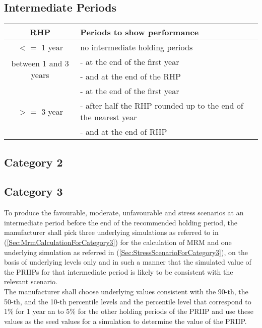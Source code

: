 \subsection{Intermediate Periods}
\begin{center}
	\begin{tabular}{| c | p{10cm} |}
		\hline
		\textbf{RHP} & \textbf{Periods to show performance}\\
		\hline
		$<=$ 1 year & no intermediate holding periods\\
		\hline
		\multirow{2}{*}{between 1 and 3 years} & - at the end of the first year\\
		& - and at the end of the RHP\\
		\hline
		\multirow{3}{*}{$>= $ 3 year} & - at the end of the first year\\
		& - after half the RHP rounded up to the end of the nearest year\\
		& - and at the end of RHP\\
		\hline
	\end{tabular}
\end{center}

\subsection{Category 2}

\subsection{Category 3}
To produce the favourable, moderate, unfavourable and stress scenarios at an intermediate period before the end of the recommended holding period, the manufacturer shall pick three underlying simulations as referred to in (\ref{Sec:MrmCalculationForCategory3}) for the calculation of MRM and one underlying simulation as referred in (\ref{Sec:StressScenarioForCategory3}), on the basis of underlying levels only and in such a manner that the simulated value of the PRIIPs for that intermediate period is likely to be consistent with the relevant scenario.\\
The manufacturer shall choose underlying values consistent with the 90-th, the 50-th, and the 10-th percentile levels and the percentile level that correspond to 1\% for 1 year an to 5\% for the other holding periods of the PRIIP and use these values as the seed values for a simulation to determine the value of the PRIIP.

